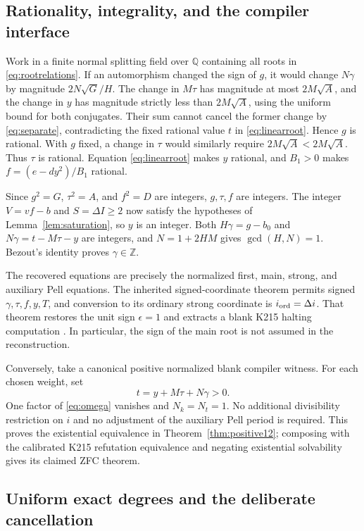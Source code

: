 \documentclass[11pt,letterpaper]{article}
\newcommand{\Z}{\mathbb Z}
\theoremstyle{remark}
\begin{document}
\subsection{Rationality, integrality, and the compiler interface}

Work in a finite normal splitting field over $\mathbb Q$ containing all
roots in \eqref{eq:rootrelations}. If an automorphism changed the sign of
$g$, it would change $N\gamma$ by magnitude $2N\sqrt G/H$.
The change in $M\tau$ has magnitude at most $2M\sqrt A$, and the change
in $y$ has magnitude strictly less than $2M\sqrt A$, using the uniform
bound for both conjugates. Their sum cannot cancel the former change by
\eqref{eq:separate}, contradicting the fixed rational value $t$ in
\eqref{eq:linearroot}. Hence $g$ is rational. With $g$ fixed, a change in
$\tau$ would similarly require $2M\sqrt A<2M\sqrt A$.
Thus $\tau$ is rational. Equation \eqref{eq:linearroot} makes $y$
rational, and $B_1>0$ makes $f=(e-dy^2)/B_1$ rational.

Since $g^2=G$, $\tau^2=A$, and $f^2=D$ are integers, $g,\tau,f$ are
integers. The integer $V=vf-b$ and $S=\Delta I\ge2$ now satisfy the
hypotheses of Lemma~\ref{lem:saturation}, so $y$ is an integer.
Both $H\gamma=g-b_0$ and $N\gamma=t-M\tau-y$ are integers, and
$N=1+2HM$ gives $\gcd(H,N)=1$. Bezout's identity proves
$\gamma\in\Z$.

The recovered equations are precisely the normalized first, main, strong,
and auxiliary Pell equations. The inherited signed-coordinate theorem
permits signed $\gamma,\tau,f,y,T$, and conversion to its ordinary strong
coordinate is $i_{\rm ord}=\Delta i$. That theorem restores the unit sign
$\epsilon=1$ and extracts a blank K215 halting computation
\cite{normalized,repo20,repo21}. In particular, the sign of the main root
is not assumed in the reconstruction.

Conversely, take a canonical positive normalized blank compiler witness.
For each chosen weight, set
\[
 t=y+M\tau+N\gamma>0.
\]
One factor of \eqref{eq:omega} vanishes and $N_k=N_t=1$.
No additional divisibility restriction on $i$ and no adjustment of the
auxiliary Pell period is required. This proves the existential equivalence
in Theorem~\ref{thm:positive12}; composing with the calibrated K215
refutation equivalence and negating existential solvability gives its
claimed ZFC theorem.

\subsection{Uniform exact degrees and the deliberate cancellation}
\end{document}
